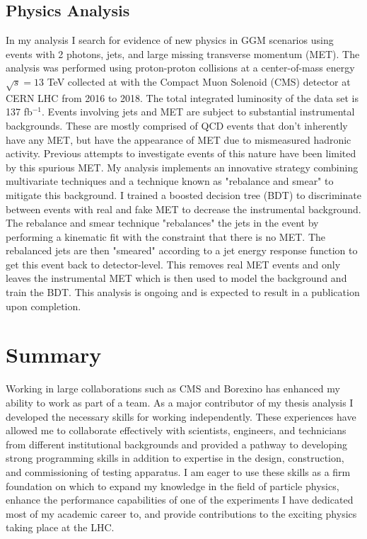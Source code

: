 \documentclass[10pt,a4paper,sans,english]{moderncv}        %
\begin{document}
\subsection{Physics Analysis}
In my analysis I search for evidence of new physics in GGM scenarios using events with 2 photons, jets, and large missing transverse momentum (MET).  The analysis was performed using proton-proton collisions at a center-of-mass energy $\sqrt{s}=13$ TeV collected at with the Compact Muon Solenoid (CMS) detector at CERN LHC from 2016 to 2018.  The total integrated luminosity of the data set is 137 fb$^{-1}$. Events involving jets and MET are subject to substantial instrumental backgrounds.  These are mostly comprised of QCD events that don't inherently have any MET, but have the appearance of MET due to mismeasured hadronic activity.  Previous attempts to investigate events of this nature have been limited by this spurious MET. My analysis implements an innovative strategy combining multivariate techniques and a technique known as "rebalance and smear" to mitigate this background.  I trained a boosted decision tree (BDT) to discriminate between events with real and fake MET to decrease the instrumental background.  The rebalance and smear technique "rebalances" the jets in the event by performing a kinematic fit with the constraint that there is no MET.  The rebalanced jets are then "smeared" according to a jet energy response function to get this event back to detector-level.  This removes real MET events and only leaves the instrumental MET which is then used to model the background and train the BDT. This analysis is ongoing and is expected to result in a publication upon completion.



\section{Summary}
Working in large collaborations such as CMS and Borexino has enhanced my ability to work as part of a team. As a major contributor of my thesis analysis I developed the necessary skills for working independently.  These experiences have allowed me to collaborate effectively with scientists, engineers, and technicians from different institutional backgrounds and provided a pathway to developing strong programming skills in addition to expertise in the design, construction, and commissioning of testing apparatus.  I am eager to use these skills as a firm foundation on which to expand my knowledge in the field of particle physics, enhance the performance capabilities of one of the experiments I have dedicated most of my academic career to, and provide contributions to the exciting physics taking place at the LHC.

	

	
	
\end{document}

